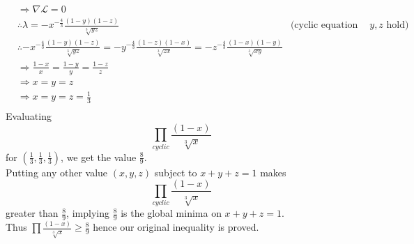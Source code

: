 \documentclass[a4paper,10pt]{article}
\begin{document}
\begin{align*}
 &\Rightarrow \nabla\mathcal{L}=0 \\
 &\therefore \lambda = -x^{-\frac{4}{3}} \frac{(1-y)(1-z)}{\sqrt[3]{yz}} &\text{(cyclic equation for $y,z$ hold)} \\
 &\therefore -x^{-\frac{4}{3}} \frac{(1-y)(1-z)}{\sqrt[3]{yz}}=-y^{-\frac{4}{3}} \frac{(1-z)(1-x)}{\sqrt[3]{zx}}=-z^{-\frac{4}{3}} \frac{(1-x)(1-y)}{\sqrt[3]{xy}} \\
 &\Rightarrow \frac{1-x}{x}=\frac{1-y}{y}=\frac{1-z}{z} \\
 &\Rightarrow x=y=z \\
 &\Rightarrow x=y=z=\frac{1}{3} \\
\end{align*}
Evaluating $$\prod_{cyclic}\frac{(1-x)}{\sqrt[3]{x}}$$ for $(\frac{1}{3},\frac{1}{3},\frac{1}{3})$, we get the value $\frac{8}{9}$.\\ 
Putting any other value $(x,y,z)$ subject to $x+y+z=1$ makes $$\prod_{cyclic}\frac{(1-x)}{\sqrt[3]{x}}$$ greater than  $\frac{8}{9}$, implying  $\frac{8}{9}$
is the global minima on $x+y+z=1$.\\
Thus $\prod \frac{(1-x)}{\sqrt[3]{x}} \ge \frac{8}{9}$ hence our original inequality is proved.
\end{document}
